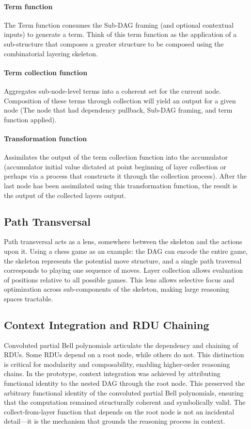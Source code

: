 \documentclass[12pt]{article}
\begin{document}
\paragraph{Term function} The Term function consumes the Sub-DAG framing (and optional contextual inputs) to generate a term. Think of this term function as the application of a sub-structure that composes a greater structure to be composed using the combinatorial layering skeleton.

\paragraph{Term collection function} Aggregates sub-node-level terms into a coherent set for the current node. Composition of these terms through collection will yield an output for a given node (The node that had dependency pullback, Sub-DAG framing, and term function applied).

\paragraph{Transformation function} Assimilates the output of the term collection function into the accumulator (accumulator initial value dictated at point beginning of layer collection or perhaps via a process that constructs it through the collection process). After the last node has been assimilated using this transformation function, the result is the output of the collected layers output.


\subsection{Path Transversal}

Path transversal acts as a lens, somewhere between the skeleton and the actions upon it. Using a chess game as an example: the DAG can encode the entire game, the skeleton represents the potential move structure, and a single path traversal corresponds to playing one sequence of moves. Layer collection allows evaluation of positions relative to all possible games. This lens allows selective focus and optimization across sub-components of the skeleton, making large reasoning spaces tractable.

\subsection{Context Integration and RDU Chaining}

Convoluted partial Bell polynomials articulate the dependency and chaining of RDUs. Some RDUs depend on a root node, while others do not. This distinction is critical for modularity and composability, enabling higher-order reasoning chains. In the prototype, context integration was achieved by attributing functional identity to the nested DAG through the root node. This preserved the arbitrary functional identity of the convoluted partial Bell polynomials, ensuring that the computation remained structurally coherent and symbolically valid. The collect-from-layer function that depends on the root node is not an incidental detail—it is the mechanism that grounds the reasoning process in context.
\end{document}
